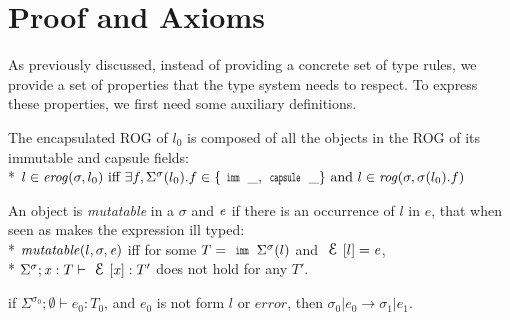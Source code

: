 \saveSpace
\section{Proof and Axioms}
\label{s:proof}
\saveSpace
{}

As previously discussed, instead of providing a concrete set of type rules, we provide a set of properties
that the type system needs to respect.
To express these properties, we first need some auxiliary definitions.


The encapsulated ROG of $l_0$ is composed of all the objects
in the ROG of its immutable and capsule fields:\\*
\indent $l \in \mathit{erog}(\sigma,l_0)
\text{ iff } \exists f, \Sigma^\sigma(l_0).f \in \{\Kw{imm}\,\_,\Kw{capsule}\,\_\}
\text{ and } l \in \mathit{rog}(\sigma,\sigma(l_0).f)$ \loseSpace

\noindent An object is \emph{mutatable} in a $\sigma$ and  ${\mathit{e}}$ if there is an occurrence of 
$l$ in $e$, that when seen as \Q@imm@ makes the expression ill typed:\\*
\indent $\mathit{mutatable}(l,\sigma,{\mathit{e}})$ iff for some $T=\Kw{imm}\,\Sigma^\sigma(l)$ and $\ctx[l]=\e$,\\*
\indent \indent $\Sigma^\sigma;\x:T\vdash\ctx[\x]:T'$ does not hold for any $T'$.\loseSpace



\begin{Assumption}[Progress]\rm
	if $\Sigma^{\sigma_0};\emptyset\vdash e_0: T_0$,
	and $e_0$ is not form $l$ or $\mathit{error}$, then
	$\sigma_0|e_0\rightarrow \sigma_1|e_1$.
\end{Assumption}

